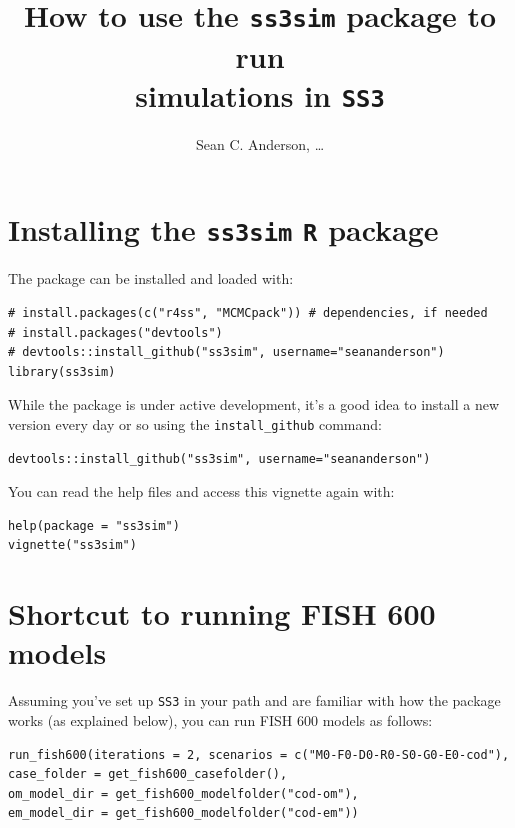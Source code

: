 \documentclass[12pt]{article}
\title{How to use the \texttt{ss3sim} package to run\\simulations in 
\texttt{SS3}}
\author{Sean C. Anderson, \ldots}
\date{}
\begin{document}
\maketitle

\section{Installing the \texttt{ss3sim} \texttt{R} package}

The package can be installed and loaded with:

\begin{verbatim}
# install.packages(c("r4ss", "MCMCpack")) # dependencies, if needed
# install.packages("devtools")
# devtools::install_github("ss3sim", username="seananderson")
library(ss3sim)
\end{verbatim}

\noindent
While the package is under active development, it's a good idea to install a 
new version every day or so using the \texttt{install\_github} command:

\begin{verbatim}
devtools::install_github("ss3sim", username="seananderson")
\end{verbatim}

\noindent
You can read the help files and access this vignette again with:

\begin{verbatim}
help(package = "ss3sim")
vignette("ss3sim")
\end{verbatim}

\noindent



\section{Shortcut to running FISH 600 models}
Assuming you've set up \texttt{SS3} in your path and are familiar with how the 
package works (as explained below), you can run FISH 600 models as follows:

\begin{verbatim}
run_fish600(iterations = 2, scenarios = c("M0-F0-D0-R0-S0-G0-E0-cod"), 
case_folder = get_fish600_casefolder(), 
om_model_dir = get_fish600_modelfolder("cod-om"), 
em_model_dir = get_fish600_modelfolder("cod-em"))
\end{verbatim}
\end{document}
